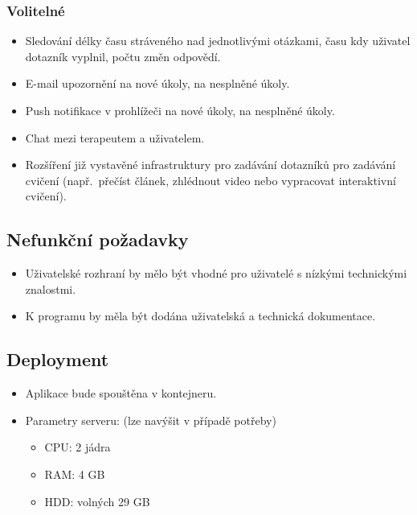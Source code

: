 \subsubsection{Volitelné}

\begin{itemize}
\item
Sledování délky času stráveného nad jednotlivými otázkami, času kdy uživatel dotazník vyplnil, počtu změn odpovědí.
\item
  E-mail upozornění na nové úkoly, na nesplněné úkoly.
\item
  Push notifikace v prohlížeči na nové úkoly, na nesplněné úkoly.
\item
  Chat mezi terapeutem a uživatelem.
\item
  Rozšíření již vystavěné infrastruktury pro zadávání dotazníků pro zadávání cvičení (např.\ přečíst článek, zhlédnout video nebo vypracovat interaktivní cvičení).
\end{itemize}


\subsection{Nefunkční požadavky}\label{subsec:nefunkcni-pozadavky}

\begin{itemize}
\item
Uživatelské rozhraní by mělo být vhodné pro uživatelé s nízkými technickými znalostmi.
\item
  K programu by měla být dodána uživatelská a technická dokumentace.
\end{itemize}


\subsection{Deployment}\label{subsec:deployment}

\begin{itemize}
\item
  Aplikace bude spouštěna v kontejneru.
\item
  Parametry serveru: (lze navýšit v případě potřeby)

  \begin{itemize}
  \item
    CPU: 2 jádra
  \item
    RAM: 4 GB
  \item
    HDD: volných 29 GB
  \end{itemize}
\end{itemize}


